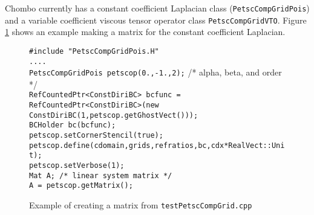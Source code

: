 Chombo currently has a constant coefficient Laplacian class (\texttt{PetscCompGridPois}) and a variable coefficient viscous tensor operator class \texttt{PetscCompGridVTO}.
Figure \ref{fig:petsc_matrix_example} shows an example making a matrix for the constant coefficient Laplacian.

\begin{figure}[h]
\begin{flushleft}
\texttt{\#include "PetscCompGridPois.H" \\
 .... \\
}\texttt{PetscCompGridPois petscop(0.,-1.,2);} /* alpha, beta, and order */\\
\texttt{RefCountedPtr<ConstDiriBC> bcfunc = RefCountedPtr<ConstDiriBC>(new ConstDiriBC(1,petscop.getGhostVect()));} \\
\texttt{BCHolder bc(bcfunc);} \\
\texttt{petscop.setCornerStencil(true);} \\
\texttt{petscop.define(cdomain,grids,refratios,bc,cdx*RealVect::Unit);} \\
\texttt{petscop.setVerbose(1);} \\
\texttt{Mat  A;         /* linear system matrix */} \\
\texttt{A = petscop.getMatrix();} \\
\caption{Example of creating a matrix from \texttt{testPetscCompGrid.cpp}}
\label{fig:petsc_matrix_example}
\end{flushleft}
\end{figure}

